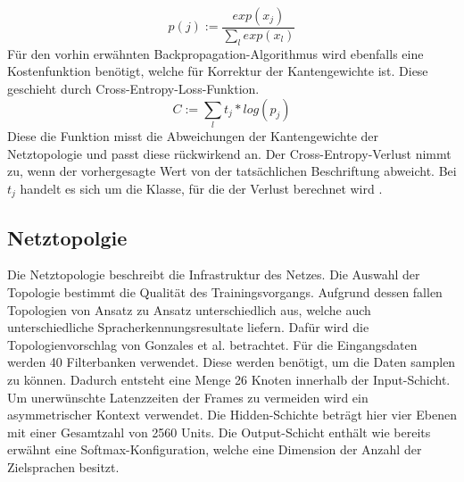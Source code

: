 \begin{equation*}
p(j) := \frac{ exp(x_{j}) }{\sum_{l}{}{ exp(x_{l})} }
\label{eq:soft}
\end{equation*}
Für den vorhin erwähnten Backpropagation-Algorithmus wird ebenfalls eine Kostenfunktion benötigt, welche für Korrektur der Kantengewichte ist. Diese geschieht durch Cross-Entropy-Loss-Funktion. 
\begin{equation*}
C:= \sum_{l}{}{ t_{j} * log(p_{j})} 
\label{eq:back}
\end{equation*}
Diese die Funktion misst die Abweichungen der Kantengewichte der Netztopologie und passt diese rückwirkend an. Der Cross-Entropy-Verlust nimmt zu, wenn der vorhergesagte Wert von der tatsächlichen Beschriftung abweicht\cite{MLCheatsheet.2017}. Bei $t_{j}$ handelt es sich um die Klasse, für die der Verlust berechnet wird \cite{GonzalezDominguez.2015}.

\subsection{Netztopolgie}
Die Netztopologie beschreibt die Infrastruktur des Netzes. Die Auswahl der Topologie bestimmt die Qualität des Trainingsvorgangs. Aufgrund dessen fallen Topologien von Ansatz zu Ansatz unterschiedlich aus, welche auch unterschiedliche Spracherkennungsresultate liefern. Dafür wird die Topologienvorschlag von Gonzales et al. betrachtet. Für die Eingangsdaten werden 40 Filterbanken verwendet. 
 Diese werden benötigt, um die Daten samplen zu können. Dadurch entsteht eine Menge 26 Knoten innerhalb der Input-Schicht. Um unerwünschte Latenzzeiten der Frames zu vermeiden wird ein asymmetrischer Kontext verwendet. Die Hidden-Schichte beträgt hier vier Ebenen mit einer Gesamtzahl von 2560 Units. Die Output-Schicht enthält wie bereits erwähnt eine Softmax-Konfiguration, welche eine Dimension der Anzahl der Zielsprachen besitzt.
 
